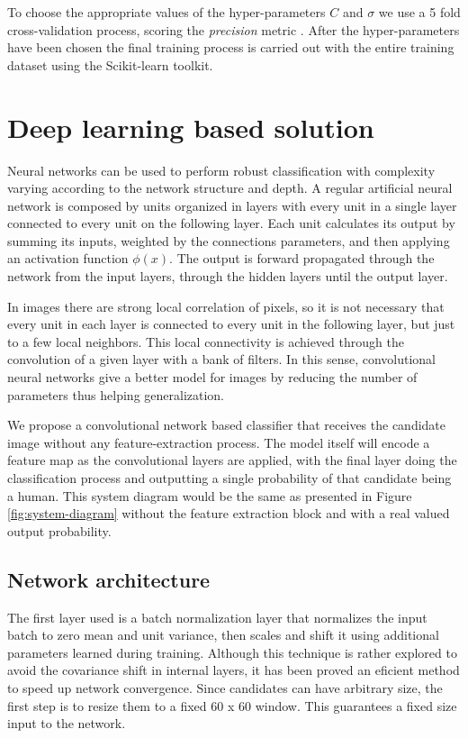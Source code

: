       To choose the appropriate values of the hyper-parameters $C$ and $\sigma$ we use a 5 fold cross-validation process, scoring the \textit{precision} metric \cite{evaluationMetrics}. After the hyper-parameters have been chosen the final training process is carried out with the entire training dataset using the Scikit-learn \cite{scikit-learn} toolkit.


\section{Deep learning based solution}
\label{sec:deep}

    Neural networks can be used to perform robust classification with complexity varying according to the network structure and depth. A regular artificial neural network is composed by units organized in layers with every unit in a single layer connected to every unit on the following layer. Each unit calculates its output by summing its inputs, weighted by the connections parameters, and then applying an activation function $\phi(x)$. The output is forward propagated through the network from the input layers, through the hidden layers until the output layer.

    In images there are strong local correlation of pixels, so it is not necessary that every unit in each layer is connected to every unit in the following layer, but just to a few local neighbors. This local connectivity is achieved through the convolution of a given layer with a bank of filters. In this sense, convolutional neural networks give a better model for images by reducing the number of parameters thus helping generalization.

    We propose a convolutional network based classifier that receives the candidate image without any feature-extraction process. The model itself will encode a feature map as the convolutional layers are applied, with the final layer doing the classification process and outputting a single probability of that candidate being a human. This system diagram would be the same as presented in Figure \ref{fig:system-diagram} without the feature extraction block and with a real valued output probability.

    \subsection{Network architecture}
        The first layer used is a batch normalization layer \cite{DBLP:journals/corr/IoffeS15} that normalizes the input batch to zero mean and unit variance, then scales and shift it using additional parameters learned during training. Although this technique is rather explored to avoid the covariance shift in internal layers, it has been proved an eficient method to speed up network convergence. Since candidates can have arbitrary size, the first step is to resize them to a fixed 60 x 60 window. This guarantees a fixed size input to the network.

